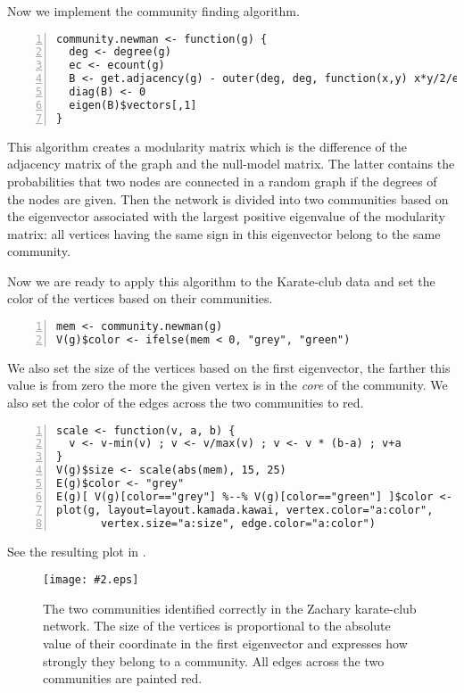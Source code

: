 \documentclass[twoside]{book}%
\newcommand{\figfigure}[2]{%
  \begin{psfrags}
  
  \texttt{[image: \#2.eps]}
  \end{psfrags}
}
\begin{document}
Now we implement the community finding algorithm.
\begin{Verbatim}[fontsize=\small,numbers=left,firstnumber=last]
community.newman <- function(g) {
  deg <- degree(g)
  ec <- ecount(g)
  B <- get.adjacency(g) - outer(deg, deg, function(x,y) x*y/2/ec)
  diag(B) <- 0
  eigen(B)$vectors[,1]
}
\end{Verbatim}
This algorithm creates a modularity matrix which is the difference of
the adjacency matrix of the graph and the null-model matrix. The
latter contains the probabilities that two nodes are connected in a
random graph if the
degrees of the nodes are given. Then the network is divided into two
communities based on the eigenvector associated with the largest
positive eigenvalue of the modularity matrix: all vertices having the
same sign in this eigenvector belong to the same community.

Now we are ready to apply this algorithm to the Karate-club data and 
set the color of the vertices based on their communities.
\begin{Verbatim}[fontsize=\small,numbers=left,firstnumber=last]
mem <- community.newman(g)
V(g)$color <- ifelse(mem < 0, "grey", "green")
\end{Verbatim}
           
We also set the size of the vertices based on the first eigenvector,
the farther this value is from zero the more the given vertex is in
the \emph{core} of the community. We also set the color of the edges
across the two communities to red.
\begin{Verbatim}[fontsize=\small,numbers=left,firstnumber=last]
scale <- function(v, a, b) {
  v <- v-min(v) ; v <- v/max(v) ; v <- v * (b-a) ; v+a
}
V(g)$size <- scale(abs(mem), 15, 25)
E(g)$color <- "grey"
E(g)[ V(g)[color=="grey"] %--% V(g)[color=="green"] ]$color <- "red"
plot(g, layout=layout.kamada.kawai, vertex.color="a:color",
       vertex.size="a:size", edge.color="a:color")
\end{Verbatim}
See the resulting plot in .

\begin{figure}[t]
\centering
\figfigure{0.65\textwidth}{karate}
\caption{The two communities identified correctly in the Zachary
  karate-club network. The size of the vertices is proportional to
  the absolute value of their coordinate in the first eigenvector and
  expresses how strongly they belong to a community. All edges across the
  two communities are painted red.}
\end{figure}
\end{document}
